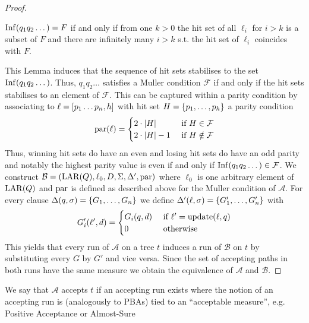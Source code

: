 \begin{proof}
  \begin{lemma}
    \cite[Lemma 2.1]{MullerSchupp}
    $\operatorname{Inf}(q_{1}q_{2}\dots) = F$ if and only if from one $k>0$ the hit set of
    all $\ell_{i}$ for $i>k$ is a subset of $F$ and there are infinitely many
    $i>k$ s.t. the hit set of $\ell_{i}$ coincides with $F$.
  \end{lemma}
  This Lemma induces that the sequence of hit sets stabilises to the set
  $\operatorname{Inf}(q_{1}q_{2}\dots)$. Thus, $q_{1}q_{2}\dots$ satisfies a Muller condition
  $\mathcal{F}$ if and only if the hit sets stabilises to an element of
  $\mathcal{F}$. This can be captured within a parity condition by associating
  to $\ell = \left[p_{1}\dots p_{n},h\right]$ with hit set
  $H = \left\{p_{1},\dots,p_{h}\right\}$ a parity condition
  \begin{equation*}
    \operatorname{par}(\ell) = \begin{cases}
      2\cdot\left\vert{H}\right\vert &\text{ if }H\in\mathcal{F}\\
      2\cdot\left\vert{H}\right\vert-1 &\text{ if }H\notin\mathcal{F}
    \end{cases}
  \end{equation*}
  Thus, winning hit sets do have an even and losing hit sets do have an odd
  parity and notably the highest parity value is even if and only if
  $\operatorname{Inf}(q_{1}q_{2}\dots)\in\mathcal{F}$.
  We construct
  $\mathcal{B}=\left(\operatorname{LAR}(Q),\ell_{0}, D, \Sigma, \Delta',\operatorname{par}\right)$ where
  $\ell_{0}$ is one arbitrary element of $\operatorname{LAR}(Q)$ and $\operatorname{par}$ is defined as
  described above for the Muller condition of $\mathcal{A}$. For every clause
  $\Delta(q,\sigma) = \left\{G_{1},\dots,G_{n}\right\}$ we define
  $\Delta'(\ell,\sigma) = \left\{G_{1}',\dots,G_{n}'\right\}$ with
  \begin{equation*}
    G_{i}'(\ell', d) = \begin{cases}
      G_{i}(q,d) &\text{ if }\ell' = \operatorname{update}(\ell,q)\\
      0          &\text{ otherwise}
    \end{cases}
  \end{equation*}
  This yields that every run of $\mathcal{A}$ on a tree $t$ induces a run of
  $\mathcal{B}$ on $t$ by substituting every $G$ by $G'$ and vice versa. Since
  the set of accepting paths in both runs have the same measure we obtain the
  equivalence of $\mathcal{A}$ and $\mathcal{B}$.
\end{proof}
We say that $\mathcal{A}$ accepts $t$ if an accepting run exists where the
notion of an accepting run is (analogously to \acp{PBA}) tied to an
\enquote{acceptable measure}, e.g. Positive Acceptance or Almost-Sure
